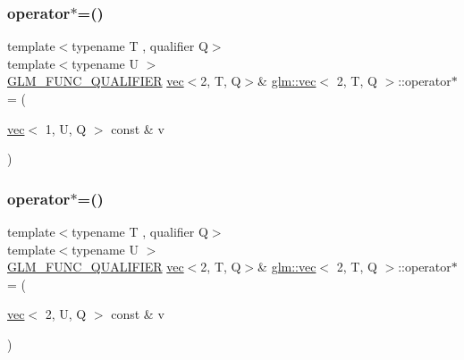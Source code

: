 \mbox{\label{structglm_1_1vec_3_012_00_01_t_00_01_q_01_4_ab1148ae3c3b8be0f46dd17ba8447ee55}} 
\subsubsection{\texorpdfstring{operator$\ast$=()}{operator*=()}\hspace{0.1cm}{\footnotesize\ttfamily [5/6]}}
{\footnotesize\ttfamily template$<$typename T , qualifier Q$>$ \\
template$<$typename U $>$ \\
\hyperlink{setup_8hpp_a33fdea6f91c5f834105f7415e2a64407}{G\+L\+M\+\_\+\+F\+U\+N\+C\+\_\+\+Q\+U\+A\+L\+I\+F\+I\+ER} \hyperlink{structglm_1_1vec}{vec}$<$2, T, Q$>$\& \hyperlink{structglm_1_1vec}{glm\+::vec}$<$ 2, T, Q $>$\+::operator$\ast$= (\begin{DoxyParamCaption}\item[{\hyperlink{structglm_1_1vec}{vec}$<$ 1, U, Q $>$ const \&}]{v }\end{DoxyParamCaption})}

\mbox{\label{structglm_1_1vec_3_012_00_01_t_00_01_q_01_4_a4f386a696770fd88224391b4d41f14e3}} 
\subsubsection{\texorpdfstring{operator$\ast$=()}{operator*=()}\hspace{0.1cm}{\footnotesize\ttfamily [6/6]}}
{\footnotesize\ttfamily template$<$typename T , qualifier Q$>$ \\
template$<$typename U $>$ \\
\hyperlink{setup_8hpp_a33fdea6f91c5f834105f7415e2a64407}{G\+L\+M\+\_\+\+F\+U\+N\+C\+\_\+\+Q\+U\+A\+L\+I\+F\+I\+ER} \hyperlink{structglm_1_1vec}{vec}$<$2, T, Q$>$\& \hyperlink{structglm_1_1vec}{glm\+::vec}$<$ 2, T, Q $>$\+::operator$\ast$= (\begin{DoxyParamCaption}\item[{\hyperlink{structglm_1_1vec}{vec}$<$ 2, U, Q $>$ const \&}]{v }\end{DoxyParamCaption})}

